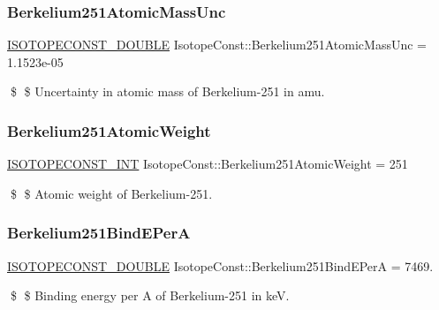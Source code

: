 \subsubsection{\texorpdfstring{Berkelium251\+Atomic\+Mass\+Unc}{Berkelium251AtomicMassUnc}}
{\footnotesize\ttfamily \mbox{\hyperlink{group___isotope_const-_macros_ga8f45a7272ce02c0b4c65c44636ed719a}{I\+S\+O\+T\+O\+P\+E\+C\+O\+N\+S\+T\+\_\+\+D\+O\+U\+B\+LE}} Isotope\+Const\+::\+Berkelium251\+Atomic\+Mass\+Unc = 1.\+1523e-\/05}

\$ \$ Uncertainty in atomic mass of Berkelium-\/251 in amu. \mbox{\label{group___isotope_const-_berkelium-_bk251_ga9f84bc091d0a5efcabae071d5f805740}} 
\subsubsection{\texorpdfstring{Berkelium251\+Atomic\+Weight}{Berkelium251AtomicWeight}}
{\footnotesize\ttfamily \mbox{\hyperlink{group___isotope_const-_macros_ga5f18360b3e99483a35c32d789e62621c}{I\+S\+O\+T\+O\+P\+E\+C\+O\+N\+S\+T\+\_\+\+I\+NT}} Isotope\+Const\+::\+Berkelium251\+Atomic\+Weight = 251}

\$ \$ Atomic weight of Berkelium-\/251. \mbox{\label{group___isotope_const-_berkelium-_bk251_ga22157049f9f318cd08b2831c1cc3e256}} 
\subsubsection{\texorpdfstring{Berkelium251\+Bind\+E\+PerA}{Berkelium251BindEPerA}}
{\footnotesize\ttfamily \mbox{\hyperlink{group___isotope_const-_macros_ga8f45a7272ce02c0b4c65c44636ed719a}{I\+S\+O\+T\+O\+P\+E\+C\+O\+N\+S\+T\+\_\+\+D\+O\+U\+B\+LE}} Isotope\+Const\+::\+Berkelium251\+Bind\+E\+PerA = 7469.}

\$ \$ Binding energy per A of Berkelium-\/251 in keV. \mbox{\label{group___isotope_const-_berkelium-_bk251_ga2df34c20cb7c3d3b9e013912f22d9fe3}} 
